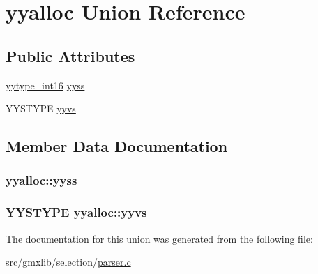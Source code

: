 \hypertarget{unionyyalloc}{\section{yyalloc \-Union \-Reference}
\label{unionyyalloc}
}
\subsection*{\-Public \-Attributes}
\begin{DoxyCompactItemize}
\item 
\hyperlink{parser_8c_ade5b97f0021a4f6c5922ead3744ab297}{yytype\-\_\-int16} \hyperlink{unionyyalloc_aad44e4a724037e32eeb58333c516bb45}{yyss}
\item 
\-Y\-Y\-S\-T\-Y\-P\-E \hyperlink{unionyyalloc_a9494cc8d8cd0eba1b44ca20fe89de5d2}{yyvs}
\end{DoxyCompactItemize}


\subsection{\-Member \-Data \-Documentation}
\hypertarget{unionyyalloc_aad44e4a724037e32eeb58333c516bb45}{
\subsubsection[{yyss}]{ {\bf yyalloc\-::yyss}}}\label{unionyyalloc_aad44e4a724037e32eeb58333c516bb45}
\hypertarget{unionyyalloc_a9494cc8d8cd0eba1b44ca20fe89de5d2}{
\subsubsection[{yyvs}]{\setlength{\rightskip}{0pt plus 5cm}\-Y\-Y\-S\-T\-Y\-P\-E {\bf yyalloc\-::yyvs}}}\label{unionyyalloc_a9494cc8d8cd0eba1b44ca20fe89de5d2}


\-The documentation for this union was generated from the following file\-:\begin{DoxyCompactItemize}
\item 
src/gmxlib/selection/\hyperlink{parser_8c}{parser.\-c}\end{DoxyCompactItemize}
